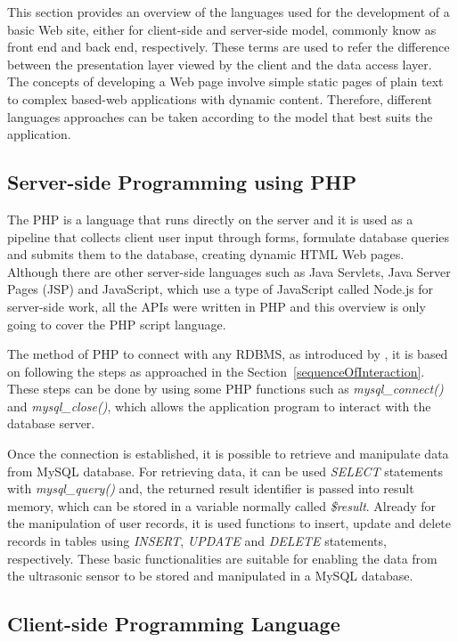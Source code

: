 This section provides an overview of the languages used for the development of a basic Web site, either for client-side and server-side model, commonly know as front end and back end, respectively. These terms are used to refer the difference between the presentation layer viewed by the client and the data access layer. The concepts of developing a Web page involve simple static pages of plain text to complex based-web applications with dynamic content. Therefore, different languages approaches can be taken according to the model that best suits the application.

\subsection{Server-side Programming using PHP}

The \gls{PHP} is a language that runs directly on the server and it is used as a pipeline that collects client user input through forms, formulate database queries and submits them to the database, creating dynamic \gls{HTML} Web pages. Although there are other server-side languages such as Java Servlets, Java Server Pages (JSP) and JavaScript, which use a type of JavaScript called Node.js for server-side work, all the \gls{API}s were written in \gls{PHP} and this overview is only going to cover the \gls{PHP} script language. 

The method of \gls{PHP} to connect with any \gls{RDBMS}, as introduced by \cite{SQUIER:2004}, it is based on following the steps as approached in the Section~\ref{sequenceOfInteraction}. These steps can be done by using some \gls{PHP} functions such as \textit{mysql\_connect()} and \textit{mysql\_close()}, which allows the application program to interact with the database server.

Once the connection is established, it is possible to retrieve and manipulate data from My\gls{SQL} database. For retrieving data, it can be used \textit{SELECT} statements with \textit{mysql\_query()} and, the returned result identifier is passed into result memory, which can be stored in a variable normally called \textit{\$result}. Already for the manipulation of user records, it is used functions to insert, update and delete records in tables using \textit{INSERT}, \textit{UPDATE} and \textit{DELETE} statements, respectively. These basic functionalities are suitable for enabling the data from the ultrasonic sensor to be stored and manipulated in a MySQL database.


\subsection{Client-side Programming Language}\label{section:clienteSide}

